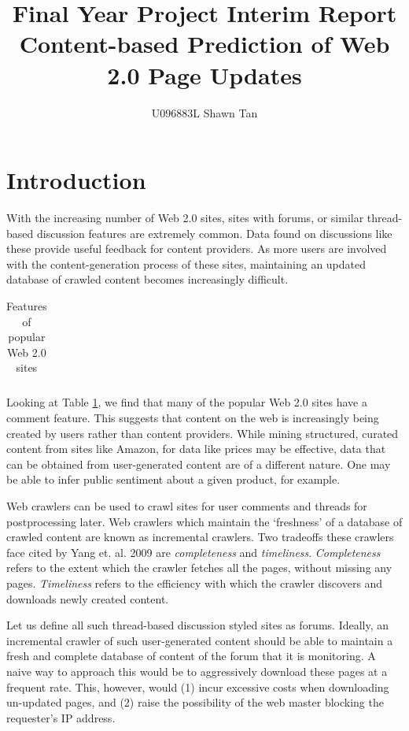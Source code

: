 \documentclass{article}
\title{Final Year Project Interim Report\\ Content-based Prediction of Web 2.0 Page Updates}
\author{U096883L Shawn Tan}
\date{}
\begin{document}
\maketitle
\section{Introduction}
With the increasing number of Web 2.0 sites, sites with forums, or similar thread-based discussion features are extremely common. Data found on discussions like these provide useful feedback for content providers. As more users are involved with the content-generation process of these sites, maintaining an updated database of crawled content becomes increasingly difficult.


\begin{table}\label{table:web20}
	\begin{center}
	{\footnotesize
	\begin{tabular}{|l|c|c|c|c|c|c|c|c|c|c|}
		\hline
			
		\hline
	\end{tabular}
	}
\end{center}
\caption{Features of popular Web 2.0 sites}
\end{table}

Looking at Table \ref{table:web20}, we find that many of the popular Web 2.0 sites have a comment feature. This suggests that content on the web is increasingly being created by users rather than content providers. While mining structured, curated content from sites like Amazon, for data like prices may be effective, data that can be obtained from user-generated content are of a different nature. One may be able to infer public sentiment about a given product, for example.

Web crawlers can be used to crawl sites for user comments and threads for postprocessing later. Web crawlers which maintain the `freshness' of a database of crawled content are known as incremental crawlers. Two tradeoffs these crawlers face cited by Yang et. al. 2009 \cite{Yang2009} are \emph{completeness} and \emph{timeliness}. \emph{Completeness} refers to the extent which the crawler fetches all the pages, without missing any pages. \emph{Timeliness} refers to the efficiency with which the crawler discovers and downloads newly created content.

Let us define all such thread-based discussion styled sites as forums. Ideally, an incremental crawler of such user-generated content should be able to maintain a fresh and complete database of content of the forum that it is monitoring. A naive way to approach this would be to aggressively download these pages at a frequent rate. This, however, would (1) incur excessive costs when downloading un-updated pages, and (2) raise the possibility of the web master blocking the requester's IP address.
\end{document}

